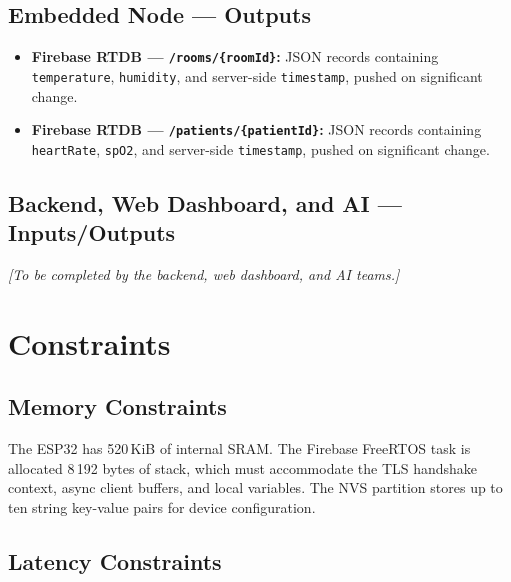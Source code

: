 \subsection*{Embedded Node — Outputs}

\begin{itemize}
	\item \textbf{Firebase RTDB — \texttt{/rooms/\{roomId\}}:}
	      JSON records containing \texttt{temperature}, \texttt{humidity}, and
	      server-side \texttt{timestamp}, pushed on significant change.
	\item \textbf{Firebase RTDB — \texttt{/patients/\{patientId\}}:}
	      JSON records containing \texttt{heartRate}, \texttt{spO2}, and
	      server-side \texttt{timestamp}, pushed on significant change.
\end{itemize}

\subsection*{Backend, Web Dashboard, and AI — Inputs/Outputs}
\begin{center}
	\textit{[To be completed by the backend, web dashboard, and AI teams.]}
\end{center}

\section{Constraints}

\subsection*{Memory Constraints}

The ESP32 has 520\,KiB of internal SRAM.
The Firebase FreeRTOS task is allocated 8\,192 bytes of stack, which must accommodate
the TLS handshake context, async client buffers, and local variables.
The NVS partition stores up to ten string key-value pairs for device configuration.

\subsection*{Latency Constraints}


